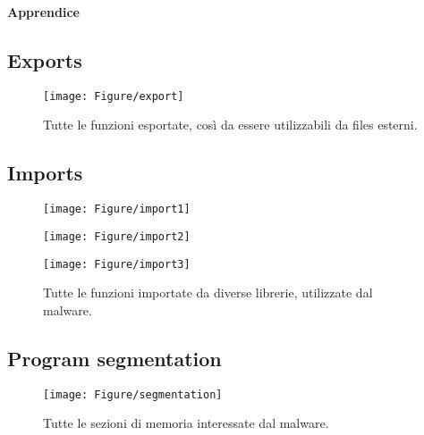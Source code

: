 \lhead{}
\renewcommand\thesubsection{\Alph{subsection}.}

\LARGE{\textbf{Apprendice}}\\
\subsection{Exports}

\begin{figure}[H]
	\centering
	\texttt{[image: Figure/export]}
	\caption{Tutte le funzioni esportate, così da essere utilizzabili da files esterni.}
\end{figure}

\subsection{Imports}
\begin{figure}[H]
	\centering
	\texttt{[image: Figure/import1]}
\end{figure}

\begin{figure}[H]
	\centering
	\texttt{[image: Figure/import2]}
\end{figure}

\begin{figure}[H]
	\centering
	\texttt{[image: Figure/import3]}
	\caption{Tutte le funzioni importate da diverse librerie, utilizzate dal malware.}
\end{figure}

\subsection{Program segmentation}

\begin{figure}[H]
	\centering
	\texttt{[image: Figure/segmentation]}
	\caption{Tutte le sezioni di memoria interessate dal malware.}
\end{figure}

